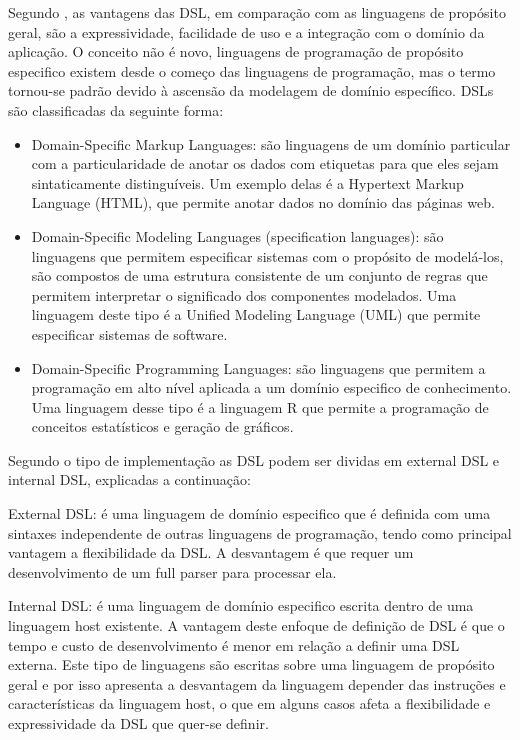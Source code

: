 Segundo \citet{Mernik:2005:DDL:1118890.1118892}, as vantagens das
DSL, em comparação com as linguagens de propósito geral, são a expressividade,
facilidade de uso e a integração com o domínio da aplicação. O conceito
não é novo, linguagens de programação de propósito especifico existem
desde o começo das linguagens de programação, mas o termo tornou-se
padrão devido à ascensão da modelagem de domínio específico. DSLs
são classificadas da seguinte forma:
%
\begin{itemize}
\item Domain-Specific Markup Languages\foreignlanguage{brazil}{: são linguagens
de um domínio particular com a particularidade de anotar os dados
com etiquetas para que eles sejam sintaticamente distinguíveis. Um
exemplo delas é a }Hypertext Markup Language (HTML),\foreignlanguage{brazil}{
que permite anotar dados no domínio das páginas web.}
\item Domain-Specific Modeling Languages (specification languages):\foreignlanguage{brazil}{
são linguagens que permitem especificar sistemas com o propósito de
modelá-los, são compostos de uma estrutura consistente de um conjunto
de regras que permitem interpretar o significado dos componentes modelados.
Uma linguagem deste tipo é a }Unified Modeling Language\foreignlanguage{brazil}{
(}UML\foreignlanguage{brazil}{)
que permite especificar sistemas de software.}
\item Domain-Specific Programming Languages:\foreignlanguage{brazil}{ são
linguagens que permitem a programação em alto nível aplicada a um
domínio especifico de conhecimento. Uma linguagem desse tipo é a linguagem
R que permite a programação de conceitos estatísticos e geração de
gráficos.}
\end{itemize}
%

Segundo o tipo de implementação as DSL podem ser dividas em \foreignlanguage{english}{external
DSL e internal DSL,} explicadas a continuação\citep{fowler2010domain}:

%
External DSL:\foreignlanguage{brazil}{ é uma linguagem de domínio
especifico que é definida com uma sintaxes independente de outras
linguagens de programação, tendo como principal vantagem a flexibilidade
da DSL. A desvantagem é que requer um desenvolvimento de um }full\foreignlanguage{brazil}{
parser para processar ela.}

Internal DSL:\foreignlanguage{brazil}{ é uma linguagem de domínio
especifico escrita dentro de uma linguagem }host\foreignlanguage{brazil}{
existente. A vantagem deste enfoque de definição de DSL é que o tempo
e custo de desenvolvimento é menor em relação a definir uma DSL externa.
Este tipo de linguagens são escritas sobre uma linguagem de propósito
geral e por isso apresenta a desvantagem da linguagem depender das
instruções e características da linguagem }host,\foreignlanguage{brazil}{
o que em alguns casos afeta a flexibilidade e expressividade da DSL
que quer-se definir.}
%

